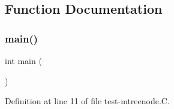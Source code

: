 \subsection{Function Documentation}
\mbox{\label{test-mtreenode_8_c_ae66f6b31b5ad750f1fe042a706a4e3d4}} 
\subsubsection{\texorpdfstring{main()}{main()}}
{\footnotesize\ttfamily int main (\begin{DoxyParamCaption}{ }\end{DoxyParamCaption})}



Definition at line 11 of file test-\/mtreenode.\+C.

